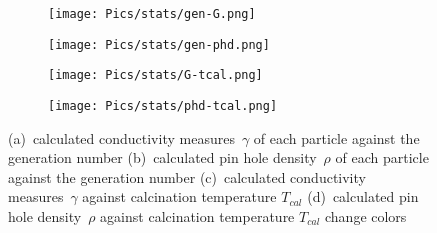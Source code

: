 \begin{figure}[hb]
    \centering
    \begin{subfigure}{.44\textwidth}
        \centering
        \texttt{[image: Pics/stats/gen-G.png]}
        \caption{} \label{fig:emma-G-gen}
    \end{subfigure}
    \begin{subfigure}{.44\textwidth}
        \centering
        \texttt{[image: Pics/stats/gen-phd.png]}
        \caption{} \label{fig:emma-phd-gen}
    \end{subfigure}
    \begin{subfigure}{.44\textwidth}
        \centering
        \texttt{[image: Pics/stats/G-tcal.png]}
        \caption{} \label{fig:g-tcal}
    \end{subfigure}
    \begin{subfigure}{.44\textwidth}
        \centering
        \texttt{[image: Pics/stats/phd-tcal.png]}
        \caption{} \label{fig:phd-tcal}
    \end{subfigure}
	\caption{
		(a)~calculated conductivity measures~$\gamma$ of each particle against the generation number %
		(b)~calculated pin hole density~$\rho$ of each particle against the generation number %
		(c)~calculated conductivity measures~$\gamma$ against calcination temperature $T_{cal}$
		(d)~calculated pin hole density~$\rho$ against calcination temperature $T_{cal}$
	change colors }

    \label{fig:emma-gen}
\end{figure}

